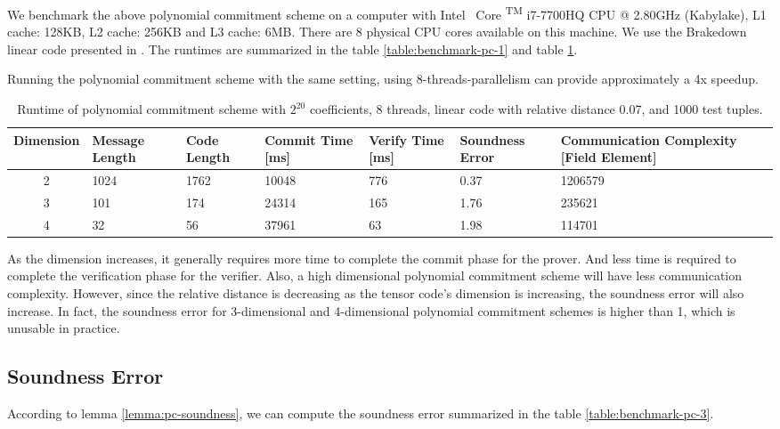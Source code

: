We benchmark the above polynomial commitment scheme on a computer with
Intel \textregistered \, Core  \textsuperscript{TM} i7-7700HQ CPU @ 2.80GHz (Kabylake), L1 cache: 128KB, L2 cache: 256KB and L3 cache: 6MB. There are 8 physical CPU cores available on this machine. We use the Brakedown linear code presented in \cite{brakedown}. The runtimes are summarized in the table \ref{table:benchmark-pc-1} and table \ref{table:benchmark-pc-2}.


Running the polynomial commitment scheme with the same setting, using 8-threads-parallelism can provide approximately a 4x speedup.

\begin{table}[h!]
\centering
\begin{tabular}{| c | m{4em}  | m{3em}  | m{3.5em} | m{2.5em} | m{5em} | m{7em} |} 
 \hline
 Dimension & Message Length & Code Length & Commit Time [ms] & Verify Time [ms] & Soundness Error & Communication Complexity [Field Element] \\ [0.5ex] 
 \hline\hline
 2 & 1024   & 1762 & 10048 & 776 & 0.37 & 1206579  \\
 \hline
 3 & 101    & 174 & 24314 & 165 & 1.76 & 235621 \\
 \hline
 4 & 32     & 56 & 37961 & 63 & 1.98 & 114701  \\ 
 \hline
\end{tabular}
\caption{Runtime of polynomial commitment scheme with $2^{20}$ coefficients, 8 threads, linear code with relative distance 0.07, and 1000 test tuples.}
\label{table:benchmark-pc-2}
\end{table}


As the dimension increases, it generally requires more time to complete the commit phase for the prover. And less time is required to complete the verification phase for the verifier. Also, a high dimensional polynomial commitment scheme will have less communication complexity. However, since the relative distance is decreasing as the tensor code's dimension is increasing, the soundness error will also increase. In fact, the soundness error for 3-dimensional and 4-dimensional polynomial commitment schemes is higher than 1, which is unusable in practice.

\subsection{Soundness Error}

According to lemma \ref{lemma:pc-soundness}, we can compute the soundness error summarized in the table \ref{table:benchmark-pc-3}.

